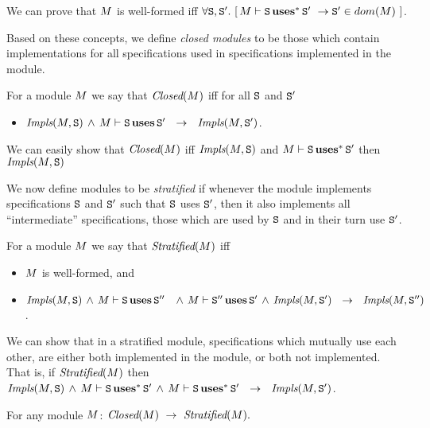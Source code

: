 \noindent
We can prove that   $\M$ is well-formed iff  $\forall \SPC,\SPC'.\  [\, \M \vdash \SPC \usestr \SPC'\ \rightarrow \SPC'\in dom(\M)\ ]$.


 Based on these concepts, we define {\em closed modules} to be those which contain implementations for all
 specifications used in  specifications  implemented in the module.

\begin{definition}
\label{def:closed}
For a module $\M$ we say that $\Closed{\M}$ iff for all ${\SPC}$ and ${\SPC}'$
\begin{itemize}
   \item
   $\Mimpls {\M} {\SPC} \,\wedge\, \M \vdash \SPC \uses \SPC'\ \ \rightarrow \ \ \Mimpls {\M} {\SPC'}$.
  \end{itemize}
\end{definition}

\noindent
We can easily show that $\Closed{\M}$ iff $\Mimpls {\M} {\SPC}$ and  $\M \vdash \SPC \usestr \SPC'$  then $\Mimpls {\M} {\SPC}$

We now define modules to be {\em stratified} if whenever the module implements
 specifications $\SPC$ and $\SPC'$ such that  $\SPC$ uses $\SPC'$, then it also implements all
 ``intermediate'' specifications, \ie those which are used by $\SPC$ and in their turn use  $\SPC'$.

\begin{definition}
\label{def:stratified}
For a module $\M$ we say that  $\Stratified{\M}$ iff
\begin{itemize}
   \item
   $\M$ is well-formed, and
   \item
   $\Mimpls {\M} {\SPC} \,\wedge\, \M \vdash \SPC \uses \SPC''\ \ \,\wedge\, \M \vdash \SPC'' \uses \SPC'
   \,\wedge\, \Mimpls {\M} {\SPC'} \ \ \rightarrow \ \ \Mimpls {\M} {\SPC''}$.


 \end{itemize}
\end{definition}

 \noindent
 We can show that in a stratified module, specifications which mutually use each other, are either both implemented in the  module, or both not implemented. That is, if $\Stratified{\M}$ then
$\Mimpls {\M} {\SPC}\, \wedge\,  \M \vdash \SPC \usestr \SPC' \, \wedge\,  \M \vdash \SPC \usestr \SPC'\ \ \rightarrow \ \ \Mimpls {\M} {\SPC'}$.

\begin{lemma}
\label{lemma:closed:is:Stratified}
For any module $\M$: $\Closed{\M} \ \rightarrow \ \Stratified{\M}.$
\end{lemma}


